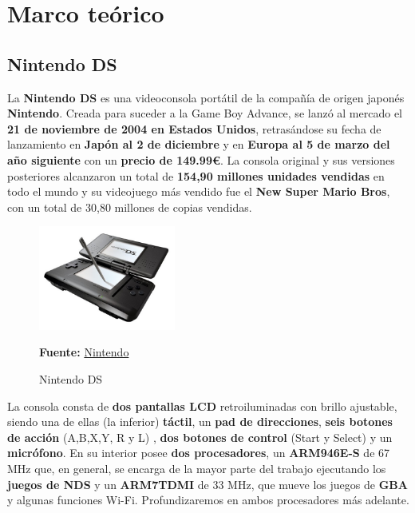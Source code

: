 
\chapter{Marco teórico}

\section{Nintendo DS} 

La \textbf{Nintendo DS} es una videoconsola portátil de la compañía de origen japonés \textbf{Nintendo}. Creada para suceder a la Game Boy Advance, se lanzó al mercado el \textbf{21 de noviembre de 2004 en Estados Unidos}, retrasándose su fecha de lanzamiento en \textbf{Japón al 2 de diciembre} y en\textbf{ Europa al 5 de marzo del año siguiente} con un \textbf{precio de 149.99€}. La consola original y sus versiones posteriores alcanzaron un total de \textbf{154,90 millones unidades vendidas} en todo el mundo y su videojuego más vendido fue el \textbf{New Super Mario Bros}, con un total de 30,80 millones de copias vendidas.

\vspace{0.5cm}

\begin{figure}[htbp]
\centering
  \includegraphics[width=0.4\textwidth]{archivos/nds.jpg}
  \caption{Nintendo DS}
  \textbf{Fuente:} \href{https://www.nintendo.co.uk/Nintendo-DS/Nintendo-DS-Family-Nintendo-UK-s-official-site-Nintendo-DS-Nintendo-DSi-Nintendo-DSi-XL-116380.html}{Nintendo}
  \label{fig:nds1}
\end{figure}

\vspace{0.5cm}

La consola consta de \textbf{ dos pantallas LCD} retroiluminadas con brillo ajustable, siendo una de ellas (la inferior) \textbf{ táctil}, un  \textbf{pad de direcciones},  \textbf{seis botones de acción} (A,B,X,Y, R y L) , \textbf{dos botones de control} (Start y Select) y un \textbf{micrófono}. En su interior posee \textbf{dos procesadores}, un \textbf{ARM946E-S} de 67 MHz que, en general, se encarga de la mayor parte del trabajo ejecutando los \textbf{juegos de NDS} y un \textbf{ARM7TDMI} de 33 MHz, que mueve los juegos de \textbf{GBA} y algunas funciones Wi-Fi. Profundizaremos en ambos procesadores más adelante.

